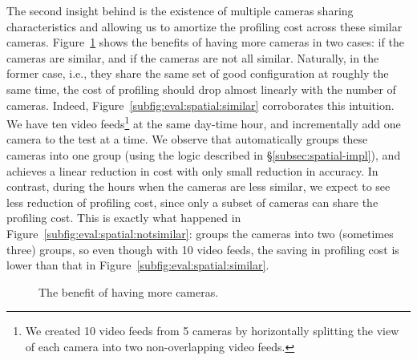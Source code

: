 The second insight behind \name is the existence of multiple cameras sharing characteristics and allowing us to amortize the profiling cost across these similar cameras.
Figure~\ref{fig:eval:spatial} shows the benefits of having more cameras in two cases:
if the cameras are similar, and if the cameras are not all similar. 
Naturally, in the former case, i.e., they share the same set of good configuration at roughly the same time, the cost of profiling should drop almost linearly with the number of cameras. Indeed, Figure~\ref{subfig:eval:spatial:similar} corroborates this intuition. We have ten video feeds\footnote{We created 10 video feeds from 5 cameras by horizontally splitting the view of each camera into two non-overlapping video feeds.} at the same day-time hour, and incrementally add one camera to the test at a time. We observe that \name automatically groups these cameras into one group (using the logic described in \S\ref{subsec:spatial-impl}), and achieves a linear reduction in cost with only small reduction in accuracy.
In contrast, during the hours when the cameras are less similar, we expect to see less reduction of profiling cost, since only a subset of cameras can share the profiling cost. 
This is exactly what happened in Figure~\ref{subfig:eval:spatial:notsimilar}: \name groups the cameras into two (sometimes three) groups, so even though with 10 video feeds, the saving in profiling cost is lower than that in Figure~\ref{subfig:eval:spatial:similar}.

\begin{figure}[t!]
    \centering
    \hspace{-0.5cm}
    \caption{The benefit of having more cameras.}
    \label{fig:eval:spatial}
    \vspace{-3pt}
\end{figure}


